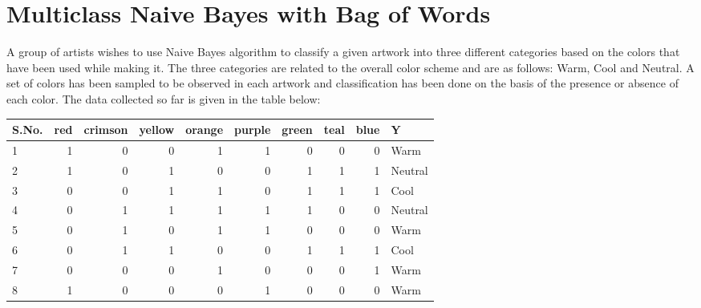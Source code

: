 \documentclass[11pt, letterpaper]{article}
\begin{document}
\newpage
\section{Multiclass Naive Bayes with Bag of Words}

    A group of artists wishes to use Naive Bayes algorithm to classify a given artwork into three different categories based on the colors that have been used while making it. The three categories are related to the overall color scheme and are as follows: Warm, Cool and Neutral. A set of colors has been sampled to be observed in each artwork and classification has been done on the basis of the presence or absence of each color. The data collected so far is given in the table below:
    
    \begin{table}[h!]
    \centering
    \small
    \begin{tabular}{|l | r | r | r | r | r | r | r | r | l|}

    
    \hline
    S.No. & red & crimson & yellow & orange & purple & green & teal & blue & Y \\ \hline
    1           & 1           & 0         & 0    & 1     & 1       & 0       & 0            & 0      & Warm \\
    2           & 1           & 0         & 1    & 0     & 0       & 1       & 1            & 1      & Neutral\\
    3           & 0           & 0         & 1    & 1     & 0       & 1       & 1            & 1      & Cool\\
    4           & 0           & 1         & 1    & 1     & 1       & 1       & 0            & 0      & Neutral\\
    5           & 0           & 1         & 0    & 1     & 1       & 0       & 0            & 0      & Warm\\
    6           & 0           & 1         & 1    & 0     & 0       & 1       & 1            & 1      & Cool\\
    7           & 0           & 0         & 0    & 1     & 0       & 0       & 0            & 1      & Warm\\
    8           & 1           & 0         & 0    & 0     & 1       & 0       & 0            & 0      & Warm\\
    \hline
    \end{tabular}
    \end{table}
    
\end{document}
